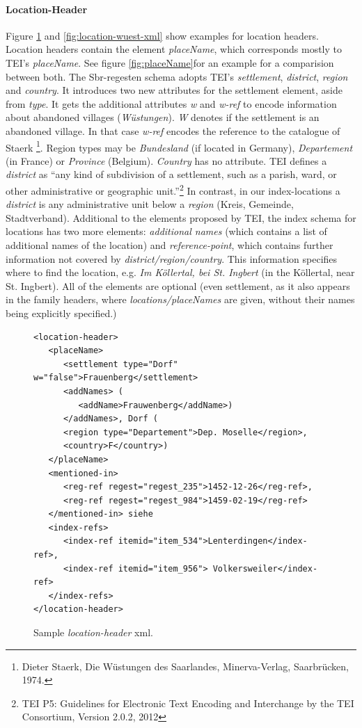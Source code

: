 \paragraph{Location-Header}
Figure \ref{fig:location-header-xml} and \ref{fig:location-wuest-xml} show examples for location headers. Location headers contain the element \textit{placeName}, which corresponds mostly to TEI's \textit{placeName}. See figure \ref{fig:placeName}for an example for a comparision between both. The Sbr-regesten schema adopts TEI's \textit{settlement}, \textit{district}, \textit{region} and \textit{country}. It introduces two new attributes for the settlement element, aside from \textit{type}. It gets the additional attributes \textit{w} and \textit{w-ref} to encode information about abandoned villages (\textit{Wüstungen}). \textit{W} denotes if the settlement is an abandoned village. In that case \textit{w-ref} encodes the reference to the catalogue of Staerk \footnote{Dieter Staerk, Die Wüstungen des Saarlandes, Minerva-Verlag, Saarbrücken, 1974.}. Region types may be \textit{Bundesland} (if located in Germany), \textit{Departement} (in France) or \textit{Province} (Belgium). \textit{Country} has no attribute. TEI defines a \textit{district} as “any kind of subdivision of a settlement, such as a parish, ward, or other administrative or geographic unit.”\footnote{TEI P5: Guidelines for Electronic Text Encoding and Interchange by the TEI Consortium, Version 2.0.2, 2012} In contrast, in our index-locations a \textit{district} is any administrative unit below a \textit{region} (Kreis, Gemeinde, Stadtverband).
Additional to the elements proposed by TEI, the index schema for locations has two more elements: \textit{additional names} (which contains a list of additional names of the location) and \textit{reference-point}, which contains further information not covered by\textit{ district/region/country}. This information specifies where to find the location, e.g. \textit{Im Köllertal, bei St. Ingbert} (in the Köllertal, near St. Ingbert). All of the elements are optional (even settlement, as it also appears in the family headers, where \textit{locations/placeNames} are given, without their names being explicitly specified.)   

\begin{figure}[H]
\begin{verbatim}
<location-header>
   <placeName>
      <settlement type="Dorf" w="false">Frauenberg</settlement>
      <addNames> (
         <addName>Frauwenberg</addName>)
      </addNames>, Dorf (
      <region type="Departement">Dep. Moselle</region>, 
      <country>F</country>) 
   </placeName>
   <mentioned-in>
      <reg-ref regest="regest_235">1452-12-26</reg-ref>, 
      <reg-ref regest="regest_984">1459-02-19</reg-ref>
   </mentioned-in> siehe 
   <index-refs>
      <index-ref itemid="item_534">Lenterdingen</index-ref>,
      <index-ref itemid="item_956"> Volkersweiler</index-ref>
   </index-refs>
</location-header>
\end{verbatim}
\label{fig:location-header-xml}
\caption{Sample \textit{location-header} xml.}
\end{figure}

